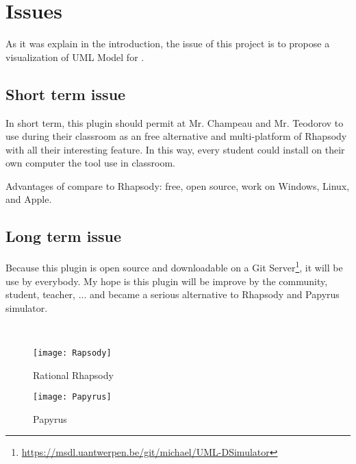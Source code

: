 
\chapter{Issues}
\label{chap:issues}


As it was explain in the introduction, the issue of this project is to propose a visualization of UML Model for \umld.

\section{Short term issue}

In short term, this plugin should permit at Mr. Champeau and Mr. Teodorov to use during their classroom \umld as an free alternative and multi-platform of Rhapsody with all their interesting feature. In this way, every student could install on their own computer the tool use in classroom.

Advantages of \umld compare to Rhapsody: free, open source, work on Windows, Linux, and Apple.

\section{Long term issue}

Because this plugin is open source and downloadable on a Git Server\footnote{\url{https://msdl.uantwerpen.be/git/michael/UML-DSimulator}}, it will be use by everybody. My hope is this plugin will be improve by the community, student, teacher, \etc... and became a serious alternative to Rhapsody and Papyrus simulator.

~\\

  \begin{figure}[h]
    \begin{minipage}{0.45\linewidth}
      \centering
      \texttt{[image: Rapsody]}
      \caption{Rational Rhapsody}
      \label{fig:rhapsody}
    \end{minipage}\hfill
    \begin{minipage}{0.45\linewidth}
      \centering
      \texttt{[image: Papyrus]}
      \caption{Papyrus}
      \label{fig:papyrus}
    \end{minipage}
  \end{figure}



